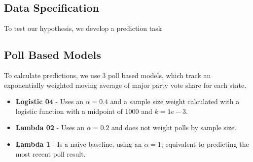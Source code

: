 \subsection{Data Specification}
To test our hypothesis, we develop a prediction task 

\subsection{Poll Based Models}
To calculate predictions, we use 3 poll based models, which track an exponentially weighted moving average of major party vote share for each state.

\begin{itemize}
    \item {\bf Logistic 04} - Uses an $\alpha = 0.4$ and a sample size weight calculated with a logistic function with a midpoint of 1000 and $k=1e-3$.
    \item {\bf Lambda 02} - Uses an $\alpha = 0.2$ and does not weight polls by sample size.
    \item {\bf Lambda 1} - Is a naive baseline, using an $\alpha = 1$; equivalent to predicting the most recent poll result.
\end{itemize}


